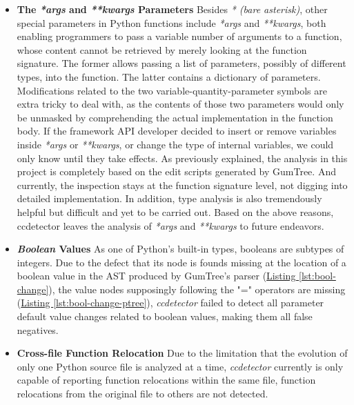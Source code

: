 \begin{itemize}
    \item \textbf{The \textit{*args} and \textit{**kwargs} Parameters} Besides \textit{* (bare asterisk)}, other special parameters in Python functions include \textit{*args} and \textit{**kwargs}, both enabling programmers to pass a variable number of arguments to a function, whose content cannot be retrieved by merely looking at the function signature. The former allows passing a list of parameters, possibly of different types, into the function. The latter contains a dictionary of parameters. Modifications related to the two variable-quantity-parameter symbols are extra tricky to deal with, as the contents of those two parameters would only be unmasked by comprehending the actual implementation in the function body. If the framework API developer decided to insert or remove variables inside \textit{*args} or \textit{**kwargs}, or change the type of internal variables, we could only know until they take effects.  As previously explained, the analysis in this project is completely based on the edit scripts generated by GumTree. And currently, the inspection stays at the function signature level, not digging into detailed implementation. In addition, type analysis is also tremendously helpful but difficult and yet to be carried out. Based on the above reasons, ccdetector leaves the analysis of \textit{*args} and \textit{**kwargs} to future endeavors.
    \item \textbf{\textit{Boolean} Values} As one of Python's built-in types, booleans are subtypes of integers. Due to the defect that its node is founds missing at the location of a boolean value in the AST produced by GumTree's parser (\hyperref[lst:bool-change]{Listing \ref*{lst:bool-change}}), the value nodes supposingly following the "=" operators are missing (\hyperref[lst:bool-change-ptree]{Listing \ref*{lst:bool-change-ptree}}), \textit{ccdetector} failed to detect all parameter default value changes related to boolean values, making them all false negatives.
    \item \textbf{Cross-file Function Relocation} Due to the limitation that the evolution of only one Python source file is analyzed at a time, \textit{ccdetector} currently is only capable of reporting function relocations within the same file, function relocations from the original file to others are not detected.
\end{itemize}

